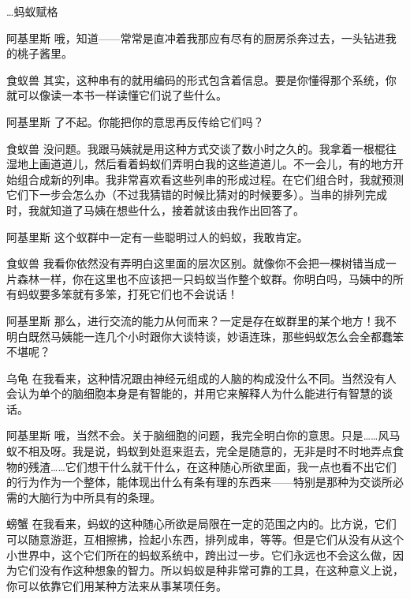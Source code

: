 \begin{dialog}{…蚂蚁赋格}
\begin{dialogue}
\item[阿基里斯]哦，知道——常常是直冲着我那应有尽有的厨房杀奔过去，一头钻进我的桃子酱里。

\item[食蚁兽]其实，这种串有的就用编码的形式包含着信息。要是你懂得那个系统，你就可以像读一本书一样读懂它们说了些什么。

\item[阿基里斯]了不起。你能把你的意思再反传给它们吗？

\item[食蚁兽]没问题。我跟马姨就是用这种方式交谈了数小时之久的。我拿着一根棍往湿地上画道道儿，然后看着蚂蚁们弄明白我的这些道道儿。不一会儿，有的地方开始组合成新的列串。我非常喜欢看这些列串的形成过程。在它们组合时，我就预测它们下一步会怎么办（不过我猜错的时候比猜对的时候要多）。当串的排列完成时，我就知道了马姨在想些什么，接着就该由我作出回答了。

\item[阿基里斯]这个蚁群中一定有一些聪明过人的蚂蚁，我敢肯定。

\item[食蚁兽]我看你依然没有弄明白这里面的层次区别。就像你不会把一棵树错当成一片森林一样，你在这里也不应该把一只蚂蚁当作整个蚁群。你明白吗，马姨中的所有蚂蚁要多笨就有多笨，打死它们也不会说话！

\item[阿基里斯]那么，进行交流的能力从何而来？一定是存在蚁群里的某个地方！我不明白既然马姨能一连几个小时跟你大谈特谈，妙语连珠，那些蚂蚁怎么会全都蠢笨不堪呢？

\item[乌龟]在我看来，这种情况跟由神经元组成的人脑的构成没什么不同。当然没有人会认为单个的脑细胞本身是有智能的，并用它来解释人为什么能进行有智慧的谈话。

\item[阿基里斯]哦，当然不会。关于脑细胞的问题，我完全明白你的意思。只是……风马蚁不相及呀。我是说，蚂蚁到处逛来逛去，完全是随意的，无非是时不时地弄点食物的残渣……它们想干什么就干什么，在这种随心所欲里面，我一点也看不出它们的行为作为一个整体，能体现出什么有条有理的东西来——特别是那种为交谈所必需的大脑行为中所具有的条理。

\item[螃蟹]在我看来，蚂蚁的这种随心所欲是局限在一定的范围之内的。比方说，它们可以随意游逛，互相擦拂，捡起小东西，排列成串，等等。但是它们从没有从这个小世界中，这个它们所在的蚂蚁系统中，跨出过一步。它们永远也不会这么做，因为它们没有作这种想象的智力。所以蚂蚁是种非常可靠的工具，在这种意义上说，你可以依靠它们用某种方法来从事某项任务。


\end{dialogue}
\end{dialog}
